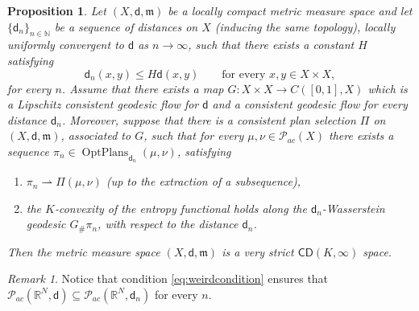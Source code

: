 \documentclass[11pt,twoside,a4paper]{article}
\newcommand{\setN}{\mathbb{N}}
\newcommand{\R}{\mathbb{R}}
\newcommand{\weakto}{\rightharpoonup}
\newcommand{\CD}{\mathsf{CD}}
\newcommand{\di}{\mathsf d} %
\newcommand{\m}{\mathfrak m} %
\DeclareMathOperator{\OptPlans}{OptPlans}
\newcommand{\Prob}{\mathscr{P}}
\theoremstyle{theorem}
\newtheorem{prop}[theorem]{Proposition}
\theoremstyle{definition}
\theoremstyle{remark}
\newtheorem{remark}[theorem]{Remark}
\theoremstyle{proof}
\begin{document}
\begin{prop}\label{prop:stabilitylast}
Let $(X,\di, \m)$ be a locally compact metric measure space and let $\{\di_n\}_{n\in \setN}$ be a sequence of distances on $X$ (inducing the same topology), locally uniformly convergent to $\di$ as $n\to \infty$, such that there exists a constant $H$ satisfying 
\begin{equation}\label{eq:weirdcondition}
    \di_n(x,y) \leq H \di(x,y) \qquad \text{for every }x,y \in X\times X,
\end{equation}
for every $n$. Assume that there exists a map $G:X \times X \to C([0,1],X)$ which is a Lipschitz consistent geodesic flow for $\di$ and a consistent geodesic flow for every distance $\di_n$. 
Moreover, suppose that there is a consistent plan selection $\Pi$ on $(X,\di,\m)$, associated to $G$, such that for every $\mu,\nu\in\Prob_{ac}(X)$ there exists a sequence $\pi_n\in \OptPlans_{\di_n}(\mu,\nu)$, satisfying
\begin{enumerate}
    \item $\pi_n \weakto \Pi(\mu,\nu)$ (up to the extraction of a subsequence),
    \item the $K$-convexity of the entropy functional holds along the $\di_n$-Wasserstein geodesic $G_\# \pi_n$, with respect to the distance $\di_n$.
\end{enumerate}
Then the metric measure space $(X,\di,\m)$ is a very strict $\CD(K,\infty)$ space.
\end{prop}

\begin{remark}
Notice that condition \eqref{eq:weirdcondition} ensures that $\Prob_{ac}(\R^N,\di)\subseteq \Prob_{ac}(\R^N,\di_n)$ for every $n$.
\end{remark}
\end{document}

